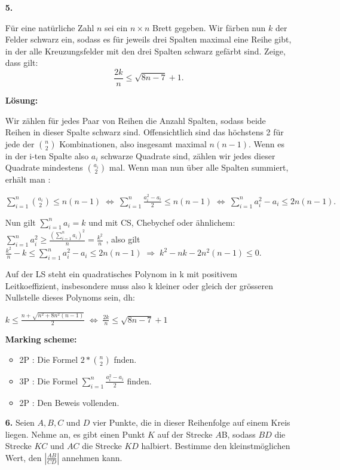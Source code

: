 \documentclass[language=german,style=solution]{smo}
\begin{document}
\begin{enumerate}
\newpage

\item[\textbf{5.}] %

Für eine natürliche Zahl $n$ sei ein $n \times n$ Brett gegeben. Wir färben nun $k$ der Felder schwarz ein, sodass es für jeweils drei Spalten maximal eine Reihe gibt, in der alle Kreuzungsfelder mit den drei Spalten schwarz gefärbt sind. Zeige, dass gilt:
\[
\frac{2k}{n} \leq \sqrt{8n-7}+1.
\]

\textbf{Lösung:}

Wir zählen für jedes Paar von Reihen die Anzahl Spalten, sodass beide Reihen in dieser Spalte schwarz sind.
Offensichtlich sind das höchstens 2 für jede der ${n \choose 2}$ Kombinationen, also insgesamt maximal $n(n-1)$. Wenn es in der i-ten Spalte also $a_i$ schwarze Quadrate sind, zählen wir jedes dieser Quadrate mindestens ${a_i \choose 2}$ mal. Wenn man nun über alle Spalten summiert, erhält man :

$\sum_{i=1}^{n} {a_i \choose 2} \leq n(n-1) \; \Leftrightarrow \ \sum_{i=1}^{n} \frac{a_i^2 - a_i}{2} \leq n(n-1) \; \Leftrightarrow \ \sum_{i=1}^{n} {a_i^2 - a_i} \leq 2n(n-1).$

Nun gilt $\sum_{i=1}^{n}{a_i} = k $ 
und mit CS, Chebychef oder ähnlichem:
$\sum_{i=1}^{n}{a_i^2} \geq \frac{(\sum_{i=1}^{n}{a_i})^2}{n} = \frac{k^2}{n}$ , also gilt $\frac{k^2}{n} - k \leq \sum_{i=1}^{n} {a_i^2 - a_i} \leq 2n(n-1) \; \Rightarrow \; k^2 - nk - 2n^2(n-1) \leq 0.$

Auf der LS steht ein quadratisches Polynom in k mit positivem Leitkoeffizient, insbesondere muss also k kleiner oder gleich der grösseren Nullstelle dieses Polynoms sein, dh:

$k \leq \frac{n + \sqrt{n^2 + 8n^2(n-1)}}{2} \; \Leftrightarrow \; \frac{2k}{n} \leq \sqrt{8n-7} + 1$


\textbf{Marking scheme:}
\begin{itemize}
    \item 2P : Die Formel $2*{n \choose 2}$ fnden.
    \item 3P : Die Formel $\sum_{i=1}^{n} \frac{a_i^2 - a_i}{2}$ finden.
    \item 2P : Den Beweis vollenden.
\end{itemize}

\newpage


\item[\textbf{6.}] %
Seien $A, B, C$ und $D$ vier Punkte, die in dieser Reihenfolge auf einem Kreis liegen. Nehme an, es gibt einen Punkt $K$ auf der Strecke $A$B, sodass $BD$ die Strecke $KC$ und $AC$ die Strecke $KD$
halbiert. Bestimme den kleinstmöglichen Wert, den $\left| \frac{AB}{CD}\right|$ annehmen kann.


\end{enumerate}
\end{document}
